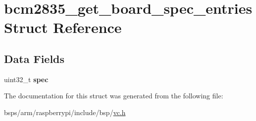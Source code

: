 \hypertarget{structbcm2835__get__board__spec__entries}{}\section{bcm2835\+\_\+get\+\_\+board\+\_\+spec\+\_\+entries Struct Reference}
\label{structbcm2835__get__board__spec__entries}
\subsection*{Data Fields}
\begin{DoxyCompactItemize}
\item 
\mbox{\label{structbcm2835__get__board__spec__entries_a6dd3075efd8186815acfd479dc94a0b9}} 
uint32\+\_\+t {\bfseries spec}
\end{DoxyCompactItemize}


The documentation for this struct was generated from the following file\+:\begin{DoxyCompactItemize}
\item 
bsps/arm/raspberrypi/include/bsp/\mbox{\hyperlink{vc_8h}{vc.\+h}}\end{DoxyCompactItemize}
